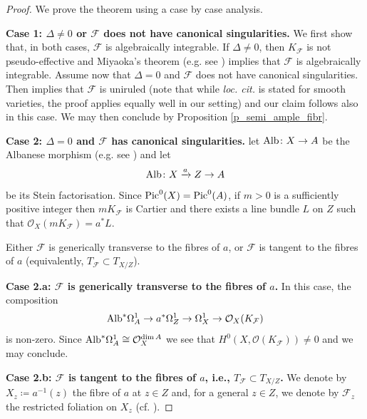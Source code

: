 \documentclass[12pt]{amsart}
\newcommand{\cal}[1]{\mathcal{#1}}
\begin{document}
\begin{proof}
We prove the theorem using a case by case analysis.

{\bf Case 1:  $\Delta \neq 0$ or $\mathcal F$ does not have canonical singularities.} We first show that, in both cases, 
$\cal F$ is algebraically integrable. 
 If $\Delta\neq 0$, then  $K_{\mathcal F}$ is not pseudo-effective and 
Miyaoka's theorem (e.g. see \cite[Theorem 7.1]{brunella00}) implies that $\mathcal F$ is algebraically integrable.
Assume now that $\Delta=0$ and 
$\cal F$ does not have canonical singularities. 
Then \cite[Corollary 3.8]{lpt18} implies that $\cal F$ is uniruled  (note that while {\it loc. cit.} is stated for smooth varieties, the proof applies equally well in our setting) and our claim follows also in this case. 
We may then conclude by Proposition \ref{p_semi_ample_fibr}. 


\medskip

{\bf Case 2: $\Delta = 0$ and $\mathcal F$ has canonical singularities.}  
let ${\rm Alb}\colon X \to  A$ be the Albanese morphism
(e.g. see \cite[Lemma 8.1]{Kawamata85a}) and let 
\[
{\rm Alb}\colon X \xrightarrow{a} Z \to A
\] be its Stein factorisation.  
Since ${\rm Pic}^0(X) = {\rm Pic}^0(A)$, if $m>0$ is a sufficiently positive integer then $mK_{\mathcal F}$ is Cartier and there exists a line bundle
$L$ on $Z$ such that $\cal O_X(mK_{\mathcal F}) = a^*L$.


Either $\mathcal F$ is generically transverse to the fibres of $a$, or $\mathcal F$ is tangent to the fibres of $a$ (equivalently, $T_{\mathcal F} \subset T_{X/Z}$).



\medskip

{\bf Case 2.a: $\mathcal F$ is generically transverse to the fibres of $a$.} In this case, the composition
\[{\rm Alb}^*\Omega^1_A \to a^*\Omega^1_Z\to  \Omega^1_X \to \mathcal O_X(K_{\mathcal F})\]
is non-zero. Since ${\rm Alb}^*\Omega^1_A \cong \mathcal O_X^{\dim A}$ we see that $H^0(X, \mathcal O(K_{\mathcal F})) \neq 0$ and we may conclude.

\medskip


{\bf Case 2.b: $\mathcal F$ is tangent to the fibres of $a$, i.e., $T_{\mathcal F} \subset T_{X/Z}$.}
We denote by $X_z \coloneq a^{-1}(z)$ the fibre of $a$ at $z\in Z$ and, for a general  $z\in Z$, we denote by $\cal F_z$ the restricted foliation on $X_z$ (cf. \cite[Proposition-Definition 3.12]{CS23b}). 


\end{proof}
\end{document}

